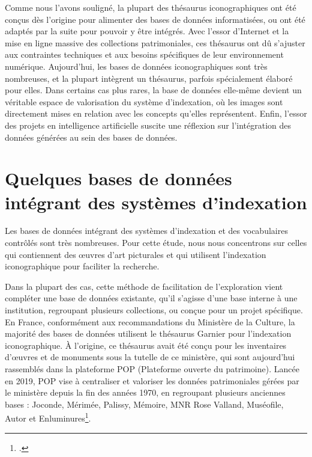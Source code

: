 Comme nous l’avons souligné, la plupart des thésaurus iconographiques ont été conçus dès l’origine pour alimenter des bases de données informatisées, ou ont été adaptés par la suite pour pouvoir y être intégrés. Avec l’essor d’Internet et la mise en ligne massive des collections patrimoniales, ces thésaurus ont dû s’ajuster aux contraintes techniques et aux besoins spécifiques de leur environnement numérique.
Aujourd’hui, les bases de données iconographiques sont très nombreuses, et la plupart intègrent un thésaurus, parfois spécialement élaboré pour elles. Dans certains cas plus rares, la base de données elle-même devient un véritable espace de valorisation du système d’indexation, où les images sont directement mises en relation avec les concepts qu’elles représentent. Enfin, l’essor des projets en intelligence artificielle suscite une réflexion sur l’intégration des données générées au sein des bases de données.

\section[Bases de données]{Quelques bases de données intégrant des systèmes d’indexation}

Les bases de données intégrant des systèmes d’indexation et des vocabulaires contrôlés sont très nombreuses. Pour cette étude, nous nous concentrons sur celles qui contiennent des œuvres d’art picturales et qui utilisent l’indexation iconographique pour faciliter la recherche.

Dans la plupart des cas, cette méthode de facilitation de l’exploration vient compléter une base de données existante, qu’il s’agisse d’une base interne à une institution, regroupant plusieurs collections, ou conçue pour un projet spécifique. En France, conformément aux recommandations du Ministère de la Culture, la majorité des bases de données utilisent le thésaurus Garnier pour l’indexation iconographique. À l’origine, ce thésaurus avait été conçu pour les inventaires d’œuvres et de monuments sous la tutelle de ce ministère, qui sont aujourd’hui rassemblés dans la plateforme POP (Plateforme ouverte du patrimoine). Lancée en 2019, POP vise à centraliser et valoriser les données patrimoniales gérées par le ministère depuis la fin des années 1970, en regroupant plusieurs anciennes bases : Joconde, Mérimée, Palissy, Mémoire, MNR Rose Valland, Muséofile, Autor et Enluminures\footcite{ministeredelaculturePOPPlateformeOuverte}.

